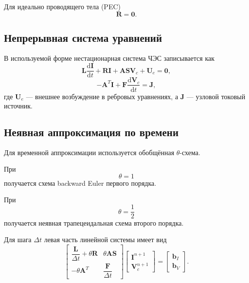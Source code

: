 \documentclass[12pt,a4paper]{article}
\newcommand{\vect}[1]{\boldsymbol{#1}}
\newcommand{\matr}[1]{\mathbf{#1}}
\begin{document}
Для идеально проводящего тела (PEC)
\begin{equation}
    \matr R = \matr 0.
\end{equation}


\subsection{Непрерывная система уравнений}

В используемой форме нестационарная система ЧЭС записывается как
\begin{equation}
    \matr L
    \frac{\mathrm d\vect I}{\mathrm dt}
    +
    \matr R\vect I
    +
    \matr A\matr S\vect V_c
    +
    \vect U_e
    =
    \vect 0,
    \label{eq:edge_continuous}
\end{equation}
\begin{equation}
    -\matr A^T\vect I
    +
    \matr F
    \frac{\mathrm d\vect V_c}{\mathrm dt}
    =
    \vect J,
    \label{eq:node_continuous}
\end{equation}
где $\vect U_e$ --- внешнее возбуждение в ребровых уравнениях,
а $\vect J$ --- узловой токовый источник.


\subsection{Неявная аппроксимация по времени}

Для временной аппроксимации используется обобщённая $\theta$-схема.

При
\begin{equation}
    \theta=1
\end{equation}
получается схема backward Euler первого порядка.

При
\begin{equation}
    \theta=\frac12
\end{equation}
получается неявная трапецеидальная схема второго порядка.

Для шага $\Delta t$ левая часть линейной системы имеет вид
\begin{equation}
\begin{bmatrix}
\dfrac{\matr L}{\Delta t}
+\theta\matr R
&
\theta\matr A\matr S
\\[2ex]
-\theta\matr A^T
&
\dfrac{\matr F}{\Delta t}
\end{bmatrix}
\begin{bmatrix}
\vect I^{n+1}
\\
\vect V_c^{n+1}
\end{bmatrix}
=
\begin{bmatrix}
\vect b_I
\\
\vect b_V
\end{bmatrix}.
\label{eq:theta_system}
\end{equation}
\end{document}
